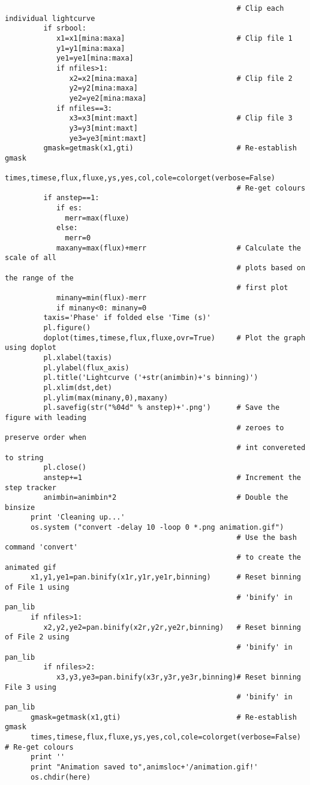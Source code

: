 \begin{verbatim}
                                                      # Clip each individual lightcurve
         if srbool:
            x1=x1[mina:maxa]                          # Clip file 1
            y1=y1[mina:maxa]
            ye1=ye1[mina:maxa]
            if nfiles>1:
               x2=x2[mina:maxa]                       # Clip file 2
               y2=y2[mina:maxa]
               ye2=ye2[mina:maxa]
            if nfiles==3:
               x3=x3[mint:maxt]                       # Clip file 3
               y3=y3[mint:maxt]
               ye3=ye3[mint:maxt]
         gmask=getmask(x1,gti)                        # Re-establish gmask
         times,timese,flux,fluxe,ys,yes,col,cole=colorget(verbose=False)
                                                      # Re-get colours
         if anstep==1:
            if es:
              merr=max(fluxe)
            else:
              merr=0
            maxany=max(flux)+merr                     # Calculate the scale of all
                                                      # plots based on the range of the
                                                      # first plot
            minany=min(flux)-merr
            if minany<0: minany=0
         taxis='Phase' if folded else 'Time (s)'
         pl.figure()
         doplot(times,timese,flux,fluxe,ovr=True)     # Plot the graph using doplot
         pl.xlabel(taxis)
         pl.ylabel(flux_axis)
         pl.title('Lightcurve ('+str(animbin)+'s binning)')
         pl.xlim(dst,det)
         pl.ylim(max(minany,0),maxany)
         pl.savefig(str("%04d" % anstep)+'.png')      # Save the figure with leading
                                                      # zeroes to preserve order when
                                                      # int convereted to string
         pl.close()
         anstep+=1                                    # Increment the step tracker
         animbin=animbin*2                            # Double the binsize
      print 'Cleaning up...'
      os.system ("convert -delay 10 -loop 0 *.png animation.gif")
                                                      # Use the bash command 'convert'
                                                      # to create the animated gif
      x1,y1,ye1=pan.binify(x1r,y1r,ye1r,binning)      # Reset binning of File 1 using
                                                      # 'binify' in pan_lib
      if nfiles>1:
         x2,y2,ye2=pan.binify(x2r,y2r,ye2r,binning)   # Reset binning of File 2 using
                                                      # 'binify' in pan_lib
         if nfiles>2:
            x3,y3,ye3=pan.binify(x3r,y3r,ye3r,binning)# Reset binning File 3 using
                                                      # 'binify' in pan_lib
      gmask=getmask(x1,gti)                           # Re-establish gmask
      times,timese,flux,fluxe,ys,yes,col,cole=colorget(verbose=False) # Re-get colours
      print ''
      print "Animation saved to",animsloc+'/animation.gif!'
      os.chdir(here)        



\end{verbatim}
